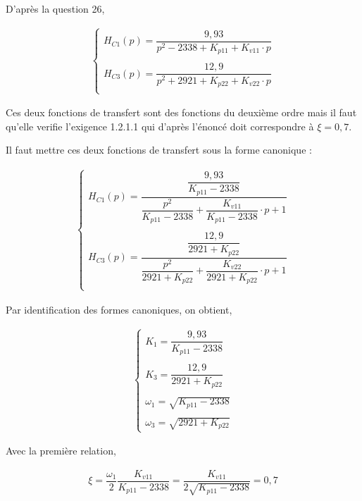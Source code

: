 \documentclass[11pt]{article}
\begin{document}
\begin{UPSTIcorrige}

D'après la question 26,



\begin{align*}
\left\{
\begin{array}{l}
H_{C1}(p)=\dfrac{9,93}{p^2-2338+K_{p11}+K_{v11}\cdot p}\\
\\
H_{C3}(p)=\dfrac{12,9}{p^2+2921+K_{p22}+K_{v22}\cdot p}\\
\end{array}
\right.
\end{align*}

Ces deux fonctions de transfert sont des fonctions du deuxième ordre mais il faut qu'elle verifie l'exigence 1.2.1.1 qui d'après l'énoncé doit correspondre à $\xi=0,7$.

Il faut mettre ces deux fonctions de transfert sous la forme canonique : 

\begin{align*}
\left\{
\begin{array}{l}
H_{C1}(p)=\dfrac{\dfrac{9,93}{K_{p11}-2338}}{\dfrac{p^2}{K_{p11}-2338}+\dfrac{K_{v11}}{K_{p11}-2338}\cdot p+1}\\
\\
H_{C3}(p)=\dfrac{\dfrac{12,9}{2921+K_{p22}}}{\dfrac{p^2}{2921+K_{p22}}+\dfrac{K_{v22}}{2921+K_{p22}}\cdot p+1}\\
\end{array}
\right.
\end{align*}

Par identification des formes canoniques, on obtient,

\begin{align*}
\left\{
\begin{array}{l}
K_1=\dfrac{9,93}{K_{p11}-2338}\\
\\
K_3=\dfrac{12,9}{2921+K_{p22}}\\
\\
\omega_1=\sqrt{K_{p11}-2338}\\
\\
\omega_3=\sqrt{2921+K_{p22}}
\end{array}
\right.
\end{align*}

Avec la première relation,

\begin{align*}
\xi=\dfrac{\omega_1}{2}\dfrac{K_{v11}}{K_{p11}-2338}=\dfrac{K_{v11}}{2\sqrt{K_{p11}-2338}}=0,7
\end{align*}


\end{UPSTIcorrige}
\end{document}

